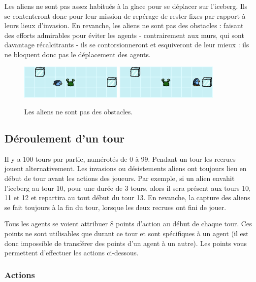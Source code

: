 Les aliens ne sont pas assez habitués à la glace pour se déplacer sur
l'iceberg. Ils se contenteront donc pour leur mission de repérage de
rester fixes par rapport à leurs lieux d'invasion. En revanche, les
aliens ne sont pas des obstacles : faisant des efforts admirables pour
éviter les agents - contrairement aux murs, qui sont davantage
récalcitrants - ils se contorsionneront et esquiveront de leur mieux :
ils ne bloquent donc pas le déplacement des agents.

\begin{figure}[!h]
    \centering
    \includegraphics[width=5cm]{img/alien_not_obstacle1}
    \hspace{0.5cm}
    \includegraphics[width=5cm]{img/alien_not_obstacle2}
    \caption*{Les aliens ne sont pas des obstacles.}
\end{figure}

\subsection{Déroulement d'un tour}\label{duxe9roulement-dun-tour}

Il y a 100 tours par partie, numérotés de 0 à 99. Pendant un tour les
recrues jouent alternativement. Les invasions ou désistements aliens ont
toujours lieu en début de tour avant les actions des joueurs. Par
exemple, si un alien envahit l'iceberg au tour 10, pour une durée de 3
tours, alors il sera présent aux tours 10, 11 et 12 et repartira au tout
début du tour 13. En revanche, la capture des aliens se fait toujours à
la fin du tour, lorsque les deux recrues ont fini de jouer.

Tous les agents se voient attribuer 8 points d'action au début de chaque
tour. Ces points ne sont utilisables que durant ce tour et sont
spécifiques à un agent (il est donc impossible de transférer des points
d'un agent à un autre). Les points vous permettent d'effectuer les
actions ci-dessous.

\subsubsection{Actions}\label{actions}

